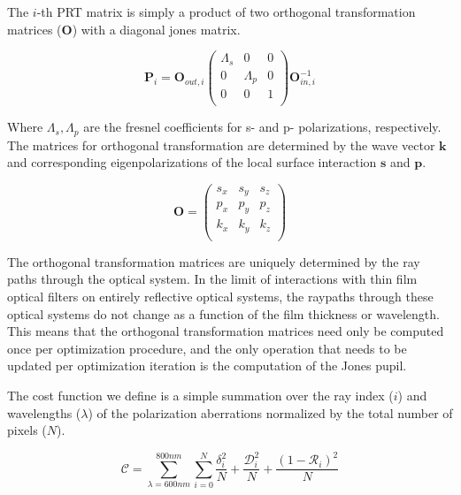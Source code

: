 The $i$-th PRT matrix is simply a product of two orthogonal transformation matrices ($\mathbf{O}$) with a diagonal jones matrix.

\begin{equation}
    \mathbf{P}_{i} = \mathbf{O}_{out,i} 
    \begin{pmatrix}
        \Lambda_{s} & 0 & 0 \\
        0 & \Lambda_{p} & 0 \\
        0 & 0 & 1 \\
    \end{pmatrix}
    \mathbf{O}_{in,i}^{-1}
\end{equation}

Where $\Lambda_{s},\Lambda_{p}$ are the fresnel coefficients for s- and p- polarizations, respectively. The matrices for orthogonal transformation are determined by the wave vector $\mathbf{k}$ and corresponding eigenpolarizations of the local surface interaction $\mathbf{s}$ and $\mathbf{p}$.

\begin{equation}
    \mathbf{O} = 
    \begin{pmatrix}
        s_{x} & s_{y} & s_{z} \\
        p_{x} & p_{y} & p_{z} \\
        k_{x} & k_{y} & k_{z} \\
    \end{pmatrix}
\end{equation}

The orthogonal transformation matrices are uniquely determined by the ray paths through the optical system. In the limit of interactions with thin film optical filters on entirely reflective optical systems, the raypaths through these optical systems do not change as a function of the film thickness or wavelength. This means that the orthogonal transformation matrices need only be computed once per optimization procedure, and the only operation that needs to be updated per optimization iteration is the computation of the Jones pupil.

The cost function we define is a simple summation over the ray index ($i$) and wavelengths ($\lambda$) of the polarization aberrations normalized by the total number of pixels ($N$). 

\begin{equation}
    \mathcal{C} = \sum_{\lambda = 600nm}^{800nm} \sum_{i=0}^{N} \frac{\delta_{i}^{2}}{N} + \frac{\mathcal{D}_{i}^{2}}{N} + \frac{(1-\mathcal{R}_{i})^{2}}{N}
\end{equation}





